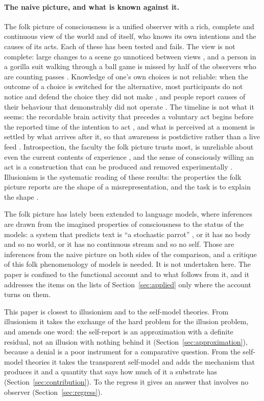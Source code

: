 \paragraph{The naive picture, and what is known against it.}
The folk picture of consciousness is a unified observer with a rich, complete and continuous view of
the world and of itself, who knows its own intentions and the causes of its acts. Each of these has
been tested and fails. The view is not complete: large changes to a scene go unnoticed between views
\citep{simons1997}, and a person in a gorilla suit walking through a ball game is missed by half of
the observers who are counting passes \citep{simons1999}. Knowledge of one's own choices is not
reliable: when the outcome of a choice is switched for the alternative, most participants do not
notice and defend the choice they did not make \citep{johansson2005}, and people report causes of
their behaviour that demonstrably did not operate \citep{nisbett1977}. The timeline is not what it
seems: the recordable brain activity that precedes a voluntary act begins before the reported time of
the intention to act \citep{libet1983}, and what is perceived at a moment is settled by what arrives
after it, so that awareness is postdictive rather than a live feed
\citep{eagleman2000,dennett1992}. Introspection, the faculty the folk picture trusts most, is
unreliable about even the current contents of experience \citep{schwitzgebel2008}, and the sense of
consciously willing an act is a construction that can be produced and removed experimentally
\citep{wegner2002}. Illusionism is the systematic reading of these results: the properties the folk
picture reports are the shape of a misrepresentation, and the task is to explain the shape
\citep{dennett1991,frankish2016}.

The folk picture has lately been extended to language models, where inferences are drawn from the
imagined properties of consciousness to the status of the models: a system that predicts text is
``a stochastic parrot'' \citep{bender2021}, or it has no body and so no world, or it has no
continuous stream and so no self. Those are inferences from the naive picture on both sides of the
comparison, and a critique of this folk phenomenology of models is needed. It is not undertaken here.
The paper is confined to the functional account and to what follows from it, and it addresses the
items on the lists of Section~\ref{sec:applied} only where the account turns on them.

This paper is closest to illusionism and to the self-model theories. From illusionism it takes the
exchange of the hard problem for the illusion problem, and amends one word: the self-report is an
approximation with a definite residual, not an illusion with nothing behind it
(Section~\ref{sec:approximation}), because a denial is a poor instrument for a comparative question.
From the self-model theories it takes the transparent self-model and adds the mechanism that produces
it and a quantity that says how much of it a substrate has (Section~\ref{sec:contribution}). To the
regress it gives an answer that involves no observer (Section~\ref{sec:regress}).

